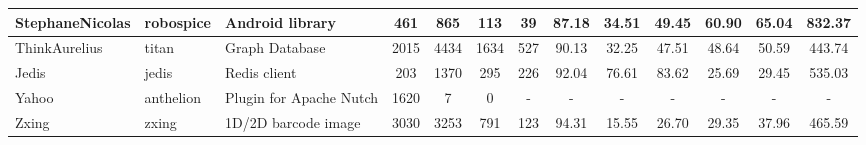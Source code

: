 \begin{table*}[]
{\begin{tabular}{lllcccccccccc}
StephaneNicolas             & robospice                                                     & Android library                                                          & 461            & 865             & 113                                                              & 39             & 87.18          & 34.51          & 49.45          & 60.90                                                             & 65.04                                                              & 832.37                                               \\ \hline
ThinkAurelius               & titan                                                         & Graph Database                                                           & 2015           & 4434            & 1634                                                             & 527            & 90.13          & 32.25          & 47.51          & 48.64                                                             & 50.59                                                              & 443.74                                               \\ \hline
Jedis                       & jedis                                                         & Redis client                                                             & 203            & 1370            & 295                                                              & 226            & 92.04          & 76.61          & 83.62          & 25.69                                                             & 29.45                                                              & 535.03                                               \\ \hline
Yahoo                       & anthelion                                                     & Plugin for Apache Nutch                                                  & 1620           & 7               & 0                                                                & -              & -              & -              & -              & -                                                                 & -                                                                  & -                                                    \\ \hline
Zxing                       & zxing                                                         & 1D/2D barcode image                                                      & 3030           & 3253            & 791                                                              & 123            & 94.31          & 15.55          & 26.70          & 29.35                                                             & 37.96                                                              & 465.59                                               \\ \hline

\end{tabular}}
\end{table*}
